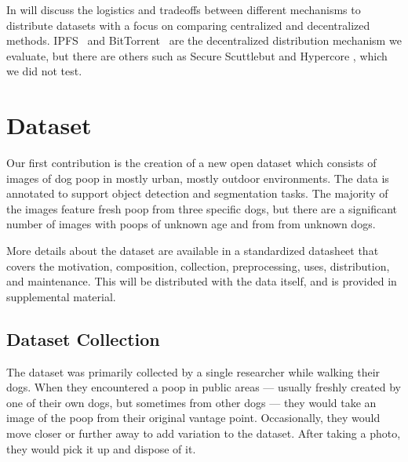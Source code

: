 \documentclass[10pt,twocolumn,letterpaper]{article}
\begin{document}


In  will discuss the logistics and tradeoffs between different mechanisms to
  distribute datasets with a focus on comparing centralized and decentralized methods.
IPFS~\cite{cohen_incentives_2003} and BitTorrent~\cite{benet_ipfs_2014} are the decentralized distribution
  mechanism we evaluate, but there are others such as Secure Scuttlebut \cite{tarr_secure_2019} and Hypercore
  \cite{frazee_dep-0002_nodate}, which we did not test.



\section{Dataset}
\label{sec:dataset}

Our first contribution is the creation of a new open dataset which consists of images of dog poop in mostly
  urban, mostly outdoor environments.
The data is annotated to support object detection and segmentation tasks.
The majority of the images feature fresh poop from three specific dogs, but there are a significant number
  of images with poops of unknown age and from from unknown dogs.


More details about the dataset are available in a standardized datasheet
\cite{gebru_datasheets_2021} that covers the motivation, composition,
collection, preprocessing, uses, distribution, and maintenance. This will be
distributed with the data itself, and is provided in supplemental material.

\subsection{Dataset Collection}

The dataset was primarily collected by a single researcher while walking their dogs.
When they encountered a poop in public areas --- usually freshly created by one of their own dogs, but
  sometimes from other dogs --- they would take an image of the poop from their original vantage point.
Occasionally, they would move closer or further away to add variation to the dataset.
After taking a photo, they would pick it up and dispose of it.
\end{document}
